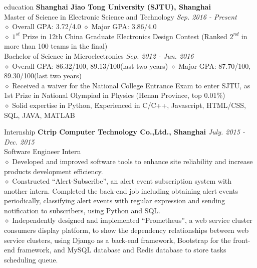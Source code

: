 \documentclass{resume} %
\begin{document}

\begin{rSection}{education}
\textbf{Shanghai Jiao Tong University (SJTU), Shanghai}
\\Master of Science in Electronic Science and Technology \hfill \emph{Sep. 2016 - Present}
\\$\diamond$ Overall GPA: 3.72/4.0 \qquad  \qquad \qquad $\diamond$ Major GPA: 3.86/4.0
\\$\diamond$ $1^{st}$ Prize in 12th China Graduate Electronics Design Contest (Ranked $2^{nd}$ in more than 100 teams in the final)
\\Bachelor of Science in Microelectronics \hfill \emph{Sep. 2012 - Jun. 2016}
\\$\diamond$ Overall GPA: 86.32/100, 89.13/100(last two years)  \qquad$\diamond$ Major GPA: 87.70/100, 89.30/100(last two years)
\\$\diamond$ Received a waiver for the National College Entrance Exam to enter SJTU, as 1st Prize in National Olympiad in Physics (Henan Province, top 0.01$\%$)
\\$\diamond$ Solid expertise in Python, Experienced in C/C++, Javascript, HTML/CSS, SQL, JAVA, MATLAB
\end{rSection}


\begin{rSection}{Internship}
\textbf{Ctrip Computer Technology Co.,Ltd., Shanghai} \hfill \emph{July. 2015 - Dec. 2015}
\\Software Engineer Intern
\\$\diamond$ Developed and improved software tools to enhance site reliability and increase products development efficiency.
\\$\diamond$ Constructed ``Alert-Subscribe'', an alert event subscription system with another intern. Completed the back-end job including obtaining alert events periodically, classifying alert events with regular expression and sending notification to subscribers, using Python and SQL.
\\$\diamond$ Independently designed and implemented ``Prometheus'', a web service cluster consumers display platform, to show the dependency relationships between web service clusters, using Django as a back-end framework, Bootstrap for the front-end framework, and MySQL database and Redis database to store tasks scheduling queue.
\end{rSection}
\end{document}
